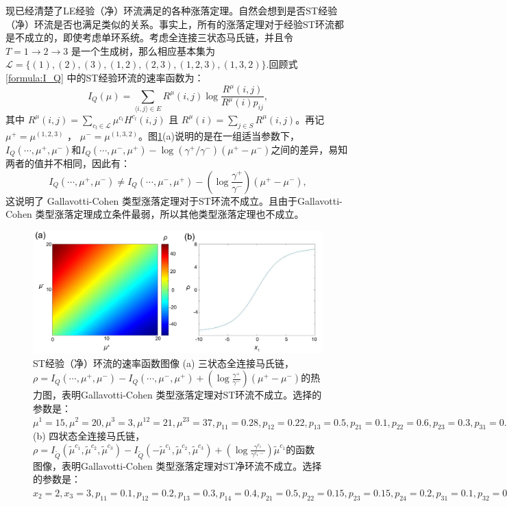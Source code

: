 现已经清楚了LE经验（净）环流满足的各种涨落定理。自然会想到是否ST经验（净）环流是否也满足类似的关系。事实上，所有的涨落定理对于经验ST环流都是不成立的，即使考虑单环系统。考虑全连接三状态马氏链，并且令 $T = 1\to 2\to 3$ 是一个生成树，那么相应基本集为$\mathcal{L} = \{(1),(2),(3),(1,2),(2,3),(1,2,3),(1,3,2)\}.$回顾式 \eqref{formula:I_Q} 中的ST经验环流的速率函数为：
\begin{equation*}
I_Q(\mu) = \sum_{\langle i,j\rangle\in E}R^{\mu}(i,j)\log\frac{R^{\mu}(i,j)}{R^{\mu}(i)p_{ij}},
\end{equation*}
其中 $R^{\mu}(i,j)=\sum_{c_l\in\mathcal{L}}\mu^{c_l}H^{c_l}(i,j)$ 且 $R^{\mu}(i)=\sum_{j\in S}R^{\mu}(i,j)$。再记 $\mu^+ = \mu^{(1,2,3)}$ ， $\mu^- = \mu^{(1,3,2)}$。图\ref{figure:ratefunction}(a)说明的是在一组适当参数下，$I_Q(\cdots,\mu^+,\mu^-)$和$I_Q(\cdots,\mu^-,\mu^+)-\log(\gamma^+ /\gamma^-) (\mu^+-\mu^-)$之间的差异，易知两者的值并不相同，因此有：
\begin{equation*}
I_Q(\cdots,\mu^+,\mu^-)
\neq I_Q(\cdots,\mu^-,\mu^+)-\left(\log\frac{\gamma^+}{\gamma^-}\right)(\mu^+-\mu^-),
\end{equation*}
这说明了 Gallavotti-Cohen 类型涨落定理对于ST环流不成立。且由于Gallavotti-Cohen 类型涨落定理成立条件最弱，所以其他类型涨落定理也不成立。
\begin{figure}[h]
	\centering
	\includegraphics[scale=0.25]{chart/ratefunction.pdf}
	\caption{ST经验（净）环流的速率函数图像 (a) 三状态全连接马氏链，$\rho=I_Q(\cdots,\mu^+,\mu^-)-I_Q(\cdots,\mu^-,\mu^+)+(\log\frac{\gamma^+}{\gamma^-})(\mu^+-\mu^-)$的热力图，表明Gallavotti-Cohen 类型涨落定理对ST环流不成立。选择的参数是：$\mu^1=15, \mu^2=20, \mu^3=3, \mu^{12}=21, \mu^{23}=37, p_{11}=0.28, p_{12}=0.22, p_{13}=0.5, p_{21}=0.1,  p_{22} = 0.6, p_{23}=0.3, p_{31}=0.3, p_{32}=0.3, p_{33}=0.4$
    (b) 四状态全连接马氏链，$\rho=I_{\tilde{Q}}(\tilde{\mu}^{c_1},\tilde{\mu}^{c_2},\tilde{\mu}^{c_3})- I_{\tilde{Q}}(-\tilde{\mu}^{c_1},\tilde{\mu}^{c_2},\tilde{\mu}^{c_3})+(\log\frac{\gamma^{c_1}}{\gamma^{c_1-}})\tilde{\mu}^{c_1}$的函数图像，表明Gallavotti-Cohen 类型涨落定理对ST净环流不成立。选择的参数是：$x_2 = 2, x_3 = 3, p_{11} = 0.1, p_{12} = 0.2, p_{13} = 0.3,
    p_{14} = 0.4, p_{21} = 0.5, p_{22} = 0.15, p_{23} = 0.15, p_{24} = 0.2, p_{31} = 0.1, p_{32} = 0.4, p_{33} = 0.25, p_{34} = 0.25,
    p_{41} = 0.2, p_{42} = 0.2, p_{43} = 0.3, p_{44} = 0.3$}\label{figure:ratefunction}
\end{figure}
